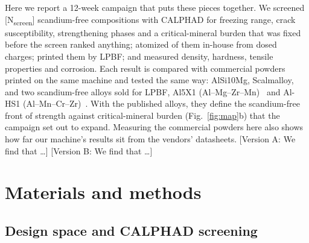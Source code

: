 \documentclass[preprint,12pt]{elsarticle}
\newcommand{\note}[1]{}
\newcommand{\note}[1]{\textcolor{blue!70!black}{\textsf{\footnotesize [Note: #1]}}}
\newcommand{\placeholder}[1]{\textcolor{red!75!black}{[#1]}}
\newcommand{\Scal}{Scalmalloy\xspace}
\newcommand{\AlSi}{AlSi10Mg\xspace}
\begin{document}
Here we report a 12-week campaign that puts these pieces together.
We screened \placeholder{N\textsubscript{screen}} scandium-free compositions with CALPHAD for freezing range, crack susceptibility, strengthening phases and a critical-mineral burden that was fixed before the screen ranked anything; atomized \NCompositions{} of them in-house from dosed charges; printed them by LPBF; and measured density, hardness, tensile properties and corrosion.
Each result is compared with commercial powders printed on the same machine and tested the same way: \AlSi, \Scal, and two scandium-free alloys sold for LPBF, Al5X1 (Al--Mg--Zr--Mn)~\cite{mds_al5x1,ds_al5x1} and Al-HS1 (Al--Mn--Cr--Zr)~\cite{ds_hoganas}. With the published alloys, they define the scandium-free front of strength against critical-mineral burden (Fig.~\ref{fig:map}b) that the campaign set out to expand. Measuring the commercial powders here also shows how far our machine's results sit from the vendors' datasheets.
\placeholder{Version A: We find that \dots}
\placeholder{Version B: We find that \dots}

\section{Materials and methods}
\label{sec:methods}

\note{Methods are written for the plan in the \#256 schedule and the \#275 seed plan. Every bracket is a value to read off the run record, the SOP (\#253) or the instrument, not to estimate. Delete any subsection whose step does not happen.}

\subsection{Design space and CALPHAD screening}
\label{sec:calphad}
\end{document}
